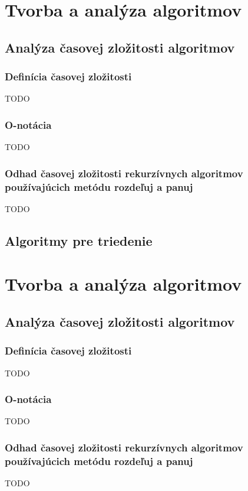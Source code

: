 \chapter[Tvorba a analýza algoritmov]{Tvorba a analýza algoritmov}
\label{tvorba_a_analyza_algoritmov} %

\section{Analýza časovej zložitosti algoritmov} 

\subsection{Definícia časovej zložitosti} TODO
\subsection{O-notácia} TODO
\subsection{Odhad časovej zložitosti rekurzívnych algoritmov používajúcich metódu rozdeľuj a panuj} TODO

\section{Algoritmy pre triedenie}\chapter[Tvorba a analýza algoritmov]{Tvorba a analýza algoritmov}
\label{tvorba_a_analyza_algoritmov} %

\section{Analýza časovej zložitosti algoritmov} 

\subsection{Definícia časovej zložitosti} TODO
\subsection{O-notácia} TODO
\subsection{Odhad časovej zložitosti rekurzívnych algoritmov používajúcich metódu rozdeľuj a panuj} TODO

